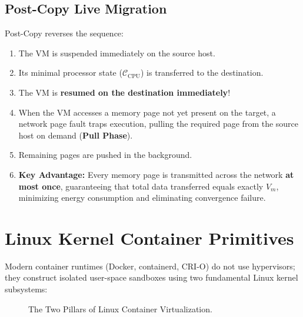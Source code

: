 \documentclass[11pt,a4paper,openany]{report}
\begin{document}
\subsection{Post-Copy Live Migration}
Post-Copy reverses the sequence:
\begin{enumerate}[leftmargin=*]
  \item The VM is suspended immediately on the source host.
  \item Its minimal processor state ($\mathcal{C}_{\text{CPU}}$) is transferred to the destination.
  \item The VM is \textbf{resumed on the destination immediately}!
  \item When the VM accesses a memory page not yet present on the target, a network page fault traps execution, pulling the required page from the source host on demand (\textbf{Pull Phase}).
  \item Remaining pages are pushed in the background.
  \item \textbf{Key Advantage:} Every memory page is transmitted across the network \textbf{at most once}, guaranteeing that total data transferred equals exactly $V_m$, minimizing energy consumption and eliminating convergence failure.
\end{enumerate}

\section{Linux Kernel Container Primitives}
Modern container runtimes (Docker, containerd, CRI-O) do not use hypervisors; they construct isolated user-space sandboxes using two fundamental Linux kernel subsystems:

\begin{figure}[H]
\centering
{}
\caption{The Two Pillars of Linux Container Virtualization.}
\end{figure}
\end{document}
